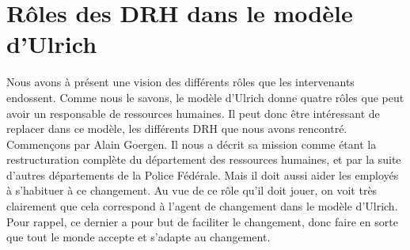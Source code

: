 \section{Rôles des DRH dans le modèle d'Ulrich}

Nous avons à présent une vision des différents rôles que les intervenants endossent. Comme nous le savons, le modèle d'Ulrich donne quatre rôles que peut avoir un responsable de ressources humaines. Il peut donc être intéressant de replacer dans ce modèle, les différents DRH que nous avons rencontré. \\

Commençons par Alain Goergen. Il nous a décrit sa mission comme étant la restructuration complète du département des ressources humaines, et par la suite d'autres départements de la Police Fédérale. Mais il doit aussi aider les employés à s'habituer à ce changement. Au vue de ce rôle qu'il doit jouer, on voit très clairement que cela correspond à l'\og agent de changement \fg{} dans le modèle d'Ulrich. Pour rappel, ce dernier a pour but de faciliter le changement, donc faire en sorte que tout le monde accepte et s'adapte au changement.\\



